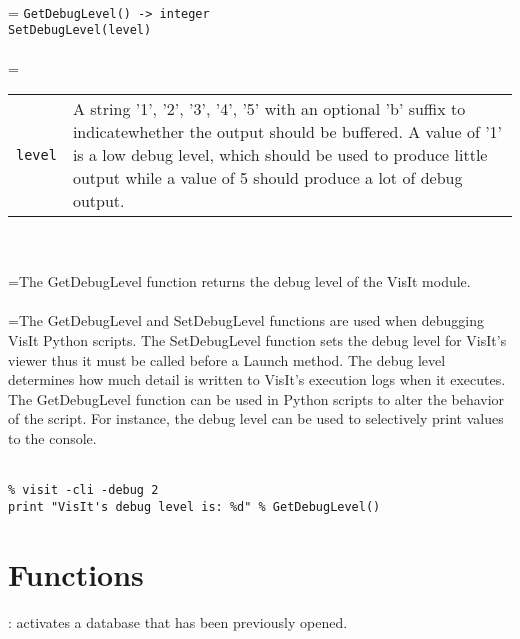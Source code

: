 \documentclass[10pt,a4paper]{report}
\begin{document}
 \\ 
\hangindent=\parindent 
\verb!GetDebugLevel() -> integer!\\ 
\verb!SetDebugLevel(level)!\\ [-3mm]

 \\ 
\hangindent=\parindent 
\begin{tabular}{lp{9cm}}
\verb!level! & A string '1', '2', '3', '4', '5' with an optional 'b' suffix to indicatewhether the output should be buffered. A value of '1' is a low debug level, which should be used to produce little output while a value of 5 should produce a lot of debug output. \\
\end{tabular} \\[-2mm]


 \\ 
\hangindent=\parindent The GetDebugLevel function returns the debug level of the VisIt module. \\[-3mm] 

 \\ 
\hangindent=\parindent The GetDebugLevel and SetDebugLevel functions are used when debugging VisIt Python scripts. The SetDebugLevel function sets the debug level for VisIt's viewer thus it must be called before a Launch method. The debug level determines how much detail is written to VisIt's execution logs when it executes. The GetDebugLevel function can be used in Python scripts to alter the behavior of the script. For instance, the debug level can be used to selectively print values to the console. \\[-3mm] 

\\[-6mm]
\begin{verbatim}% visit -cli -debug 2
print "VisIt's debug level is: %d" % GetDebugLevel()
\end{verbatim}
\newpage

\chapter{Functions}


{}
: activates a database that has been previously opened.\\[-3mm]
\end{document}
